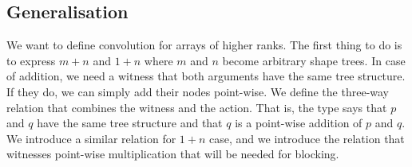 \subsection{Generalisation\label{sec:general-ix-ops}}
We want to define convolution for arrays of higher ranks.  The first thing
to do is to express $m + n$ and $1 + n$ where $m$ and $n$ become arbitrary
shape trees.  In case of addition, we need a witness that both arguments
have the same tree structure.  If they do, we can simply add their nodes point-wise.
We define the three-way relation  that combines the witness and
the action.  That is, the type  \AF{+}    says that
$p$ and $q$ have the same tree structure and that $q$ is a point-wise addition
of $p$ and $q$.  We introduce a similar relation  for $1 + n$
case, and we introduce the relation  that witnesses point-wise
multiplication that will be needed for blocking.
